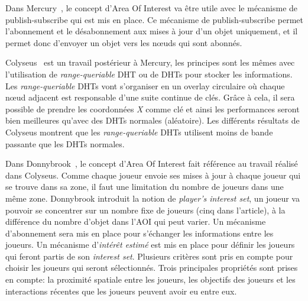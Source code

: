 	\par Dans Mercury~\cite{1015507}, le concept d'Area Of Interest va être utile avec le mécanisme de publish-subscribe qui est mis en place. Ce mécanisme de publish-subscribe permet l'abonnement et le désabonnement aux mises à jour d'un objet uniquement, et il permet donc d'envoyer un objet vers les nœuds qui sont abonnés.\\
	\par Colyseus~\cite{1267692} est un travail postérieur à Mercury, les principes sont les mêmes avec l'utilisation de \textit{range-queriable} DHT ou de DHTs pour stocker les informations. Les \textit{range-queriable} DHTs vont s'organiser en un overlay circulaire où chaque nœud adjacent est responsable d'une suite continue de clés. Grâce à cela, il sera possible de prendre les coordonnées \textit{X} comme clé et ainsi les performances seront bien meilleures qu'avec des DHTs normales (aléatoire). Les différents résultats de Colyseus montrent que les \textit{range-queriable} DHTs utilisent moins de bande passante que les DHTs normales. \\
	\par Dans Donnybrook~\cite{1403002}, le concept d'Area Of Interest fait référence au travail réalisé dans Colyseus. Comme chaque joueur envoie ses mises à jour à chaque joueur qui se trouve dans sa zone, il faut une limitation du nombre de joueurs dans une même zone. Donnybrook introduit la notion de \textit{player's interest set}, un joueur va pouvoir se concentrer sur un nombre fixe de joueurs (cinq dans l'article), à la différence du nombre d'objet dans l'AOI qui peut varier. Un mécanisme d'abonnement sera mis en place pour s'échanger les informations entre les joueurs. Un mécanisme d'\textit{intérêt estimé} est mis en place pour définir les joueurs qui feront partis de son \textit{interest set}. Plusieurs critères sont pris en compte pour choisir les joueurs qui seront sélectionnés. Trois principales propriétés sont prises en compte: la proximité spatiale entre les joueurs, les objectifs des joueurs et les interactions récentes que les joueurs peuvent avoir eu entre eux.\\
